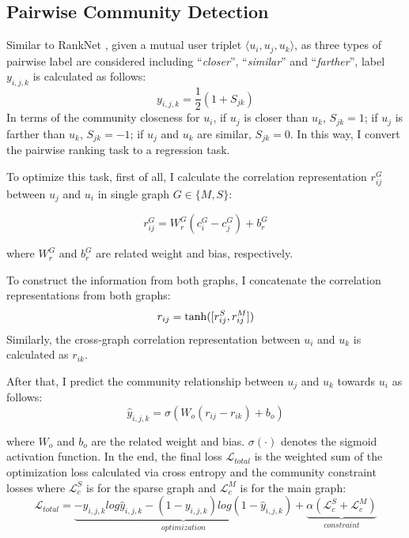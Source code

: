 \subsection{Pairwise Community Detection}\label{sc:pcd}

Similar to RankNet \cite{burges2010ranknet}, given a mutual user triplet  $\langle u_i,u_j,u_k \rangle$, as three types of pairwise label are considered including ``\textit{closer}'', ``\textit{similar}'' and ``\textit{farther}'', label $y_{i,j,k}$  is calculated as follows:
\begin{equation}\label{eq:y}
y_{i,j,k} = \frac{1}{2}(1+S_{jk})
\end{equation}
In terms of the community closeness for $u_i$, if $u_j$ is closer than $u_k$, $S_{jk} = 1$; if $u_j$ is farther than $u_k$, $S_{jk} = -1$; if $u_j$ and $u_k$ are similar, $S_{jk} = 0$. In this way, I convert the pairwise ranking task to a regression task. 

To optimize this task, first of all, I calculate the correlation representation $r^{G}_{ij}$ between $u_j$ and $u_i$ in single graph $G \in \{M,S\}$:

\begin{equation}\label{eq:gr}
r^{G}_{ij} = W^{G}_{r}(c_{i}^{G} - c_{j}^{G}) +  b^{G}_{r} 
\end{equation}

where $ W^{G}_{r}$ and $ b^{G}_{r}$ are related weight and bias, respectively. 

To construct the information from both graphs, I concatenate the correlation representations from both graphs:
\begin{equation} \label{eq:cr}
r_{ij} = {\rm tanh}([r^{S}_{ij},r^{M}_{ij}])
\end{equation}
Similarly, the cross-graph correlation representation  between $u_i$ and $u_k$ is calculated as $r_{ik}$. 

After that, I predict the community relationship between $u_j$ and $u_k$ towards $u_i$ as follows:
\begin{equation} \label{eq:yp}
\hat{y}_{i,j,k} = \sigma(W_{o}(r_{ij} - r_{ik}) +  b_{o})
\end{equation}

where $W_{o}$ and $b_{o}$ are the related weight and bias. $\sigma(\cdot)$ denotes the sigmoid activation function. In the end, the final loss $\mathcal{L}_{total}$ is the weighted sum of the optimization loss calculated via cross entropy and the community constraint losses where  $\mathcal{L}_{c}^S$ is for the sparse graph and $\mathcal{L}_{c}^M$ is for the main graph:
\begin{equation}\label{eq:loss}
\mathcal{L}_{total} = \underbrace{-y_{i,j,k}log\hat{y}_{i,j,k}-(1-y_{i,j,k})log(1-\hat{y}_{i,j,k})}_{optimization} + \underbrace{\alpha(\mathcal{L}_{c}^S + \mathcal{L}_{c}^M)}_{constraint}
\end{equation}

